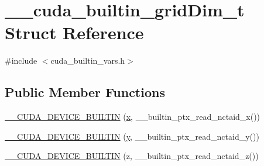 \hypertarget{struct____cuda__builtin__gridDim__t}{\section{\-\_\-\-\_\-cuda\-\_\-builtin\-\_\-grid\-Dim\-\_\-t Struct Reference}
\label{struct____cuda__builtin__gridDim__t}
}


{\ttfamily \#include $<$cuda\-\_\-builtin\-\_\-vars.\-h$>$}

\subsection*{Public Member Functions}
\begin{DoxyCompactItemize}
\item 
\hyperlink{struct____cuda__builtin__gridDim__t_a654db8f661843d4eede458022c346495}{\-\_\-\-\_\-\-C\-U\-D\-A\-\_\-\-D\-E\-V\-I\-C\-E\-\_\-\-B\-U\-I\-L\-T\-I\-N} (\hyperlink{OWGeneric__SensorStation_8ino_ad0da36b2558901e21e7a30f6c227a45e}{x}, \-\_\-\-\_\-builtin\-\_\-ptx\-\_\-read\-\_\-nctaid\-\_\-x())
\item 
\hyperlink{struct____cuda__builtin__gridDim__t_a77f2296f5c8266282d715ac9badbc47a}{\-\_\-\-\_\-\-C\-U\-D\-A\-\_\-\-D\-E\-V\-I\-C\-E\-\_\-\-B\-U\-I\-L\-T\-I\-N} (\hyperlink{OWGeneric__SensorStation_8ino_aa4f0d3eebc3c443f9be81bf48561a217}{y}, \-\_\-\-\_\-builtin\-\_\-ptx\-\_\-read\-\_\-nctaid\-\_\-y())
\item 
\hyperlink{struct____cuda__builtin__gridDim__t_a9fbd8b2ab4b22e464608275e9acd340e}{\-\_\-\-\_\-\-C\-U\-D\-A\-\_\-\-D\-E\-V\-I\-C\-E\-\_\-\-B\-U\-I\-L\-T\-I\-N} (z, \-\_\-\-\_\-builtin\-\_\-ptx\-\_\-read\-\_\-nctaid\-\_\-z())
\end{DoxyCompactItemize}


